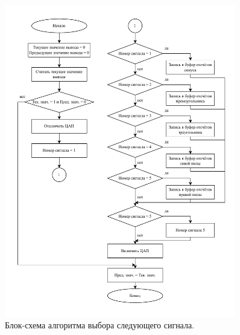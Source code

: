 	\begin{figure}[H]
    \centering
    \includegraphics[width=0.9\textwidth]{../image/plus_signal.pdf}
    \caption{Блок-схема алгоритма выбора следующего сигнала.}
	\end{figure}	
	
